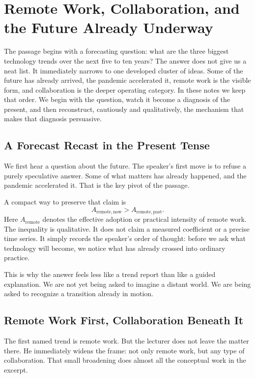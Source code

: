 \chapter{Remote Work, Collaboration, and the Future Already Underway}

The passage begins with a forecasting question: what are the three biggest technology trends over the next five to ten years? The answer does not give us a neat list. It immediately narrows to one developed cluster of ideas. Some of the future has already arrived, the pandemic accelerated it, remote work is the visible form, and collaboration is the deeper operating category. In these notes we keep that order. We begin with the question, watch it become a diagnosis of the present, and then reconstruct, cautiously and qualitatively, the mechanism that makes that diagnosis persuasive.

\section{A Forecast Recast in the Present Tense}

We first hear a question about the future. The speaker's first move is to refuse a purely speculative answer. Some of what matters has already happened, and the pandemic accelerated it. That is the key pivot of the passage.

A compact way to preserve that claim is
\begin{equation}
A_{\mathrm{remote},\mathrm{now}} > A_{\mathrm{remote},\mathrm{past}} .
\end{equation}
Here \(A_{\mathrm{remote}}\) denotes the effective adoption or practical intensity of remote work. The inequality is qualitative. It does not claim a measured coefficient or a precise time series. It simply records the speaker's order of thought: before we ask what technology will become, we notice what has already crossed into ordinary practice.

This is why the answer feels less like a trend report than like a guided explanation. We are not yet being asked to imagine a distant world. We are being asked to recognize a transition already in motion.

\section{Remote Work First, Collaboration Beneath It}

The first named trend is remote work. But the lecturer does not leave the matter there. He immediately widens the frame: not only remote work, but any type of collaboration. That small broadening does almost all the conceptual work in the excerpt.

